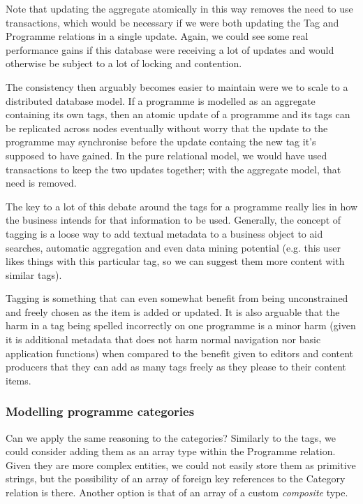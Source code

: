\documentclass[11pt,a4paper]{article}
\begin{document}
Note that updating the aggregate atomically in this way removes the need
to use transactions, which would be necessary if we were both updating the
Tag and Programme relations in a single update. Again, we could see some
real performance gains if this database were receiving a lot of updates and
would otherwise be subject to a lot of locking and contention. \cite{sadalage2012nosql}

The consistency then arguably becomes easier to maintain were we to scale
to a distributed database model. If a programme is modelled as an aggregate
containing its own tags, then an atomic update of a programme and its tags
can be replicated across nodes eventually without worry that the update
to the programme may synchronise before the update containg the new tag it's
supposed to have gained. In the pure relational model, we would have used
transactions to keep the two updates together; with the aggregate model,
that need is removed.

The key to a lot of this debate around the tags for a programme really lies
in how the business intends for that information to be used. Generally,
the concept of tagging is a loose way to add textual metadata to a
business object to aid searches, automatic aggregation and even data
mining potential (e.g. this user likes things with this particular tag,
so we can suggest them more content with similar tags).

Tagging is something that can even somewhat benefit from being unconstrained
and freely chosen as the item is added or updated. \cite{smith2008tagging}
It is also arguable that the harm in a tag being spelled incorrectly
on one programme is a minor harm (given it is additional metadata that
does not harm normal navigation nor basic application functions) when
compared to the benefit given to editors and content producers that
they can add as many tags freely as they please to their content items.

\subsubsection{Modelling programme categories}

Can we apply the same reasoning to the categories? Similarly to the
tags, we could consider adding them as an array type within the
Programme relation. Given they are more complex entities, we could
not easily store them as primitive strings, but the possibility of an
array of foreign key references to the Category relation is there. Another
option is that of an array of a custom \emph{composite} type.
\end{document}
